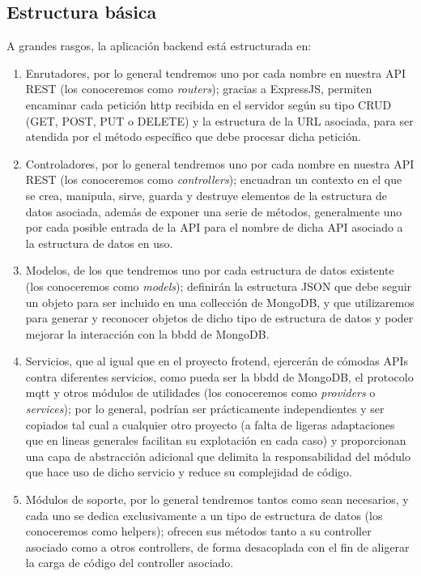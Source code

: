 \subsection{Estructura básica}
\label{ch:Capitulo4.6.2}

A grandes rasgos, la aplicación backend está estructurada en:
\begin{enumerate}
 \item Enrutadores, por lo general tendremos uno por cada nombre en nuestra API REST (los conoceremos como \textit{routers}); gracias a ExpressJS, permiten encaminar cada petición http recibida en el servidor según su tipo CRUD (GET, POST, PUT o DELETE) y la estructura de la URL asociada, para ser atendida por el método específico que debe procesar dicha petición.
 \item Controladores, por lo general tendremos uno por cada nombre en nuestra API REST (los conoceremos como \textit{controllers}); encuadran un contexto en el que se crea, manipula, sirve, guarda y destruye elementos de la estructura de datos asociada, además de exponer una serie de métodos, generalmente uno por cada posible entrada de la API para el nombre de dicha API asociado a la estructura de datos en uso.
 \item Modelos, de los que tendremos uno por cada estructura de datos existente (los conoceremos como \textit{models}); definirán la estructura JSON que debe seguir un objeto para ser incluido en una collección de MongoDB, y que utilizaremos para generar y reconocer objetos de dicho tipo de estructura de datos y poder mejorar la interacción con la \gls{bbdd} de MongoDB.
 \item Servicios, que al igual que en el proyecto frotend, ejercerán de cómodas APIs contra diferentes servicios, como pueda ser la \gls{bbdd} de MongoDB, el protocolo \gls{mqtt} y otros módulos de utilidades (los conoceremos como \textit{providers} o \textit{services}); por lo general, podrían ser prácticamente independientes y ser copiados tal cual a cualquier otro proyecto (a falta de ligeras adaptaciones que en lineas generales facilitan su explotación en cada caso) y proporcionan una capa de abstracción adicional que delimita la responsabilidad del módulo que hace uso de dicho servicio y reduce su complejidad de código.
 \item Módulos de soporte, por lo general tendremos tantos como sean necesarios, y cada uno se dedica exclusivamente a un tipo de estructura de datos (los conoceremos como helpers); ofrecen sus métodos tanto a su controller asociado como a otros controllers, de forma desacoplada con el fin de aligerar la carga de código del controller asociado.

\end{enumerate}

